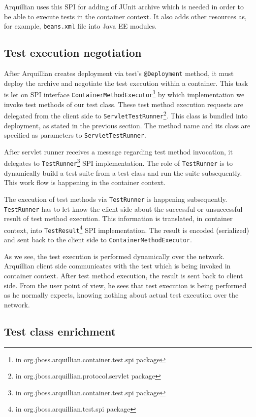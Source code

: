 \documentclass[12pt,final,oneside]{fithesis}
\begin{document}
Arquillian uses this SPI for adding of JUnit archive which is needed in order to be able to execute tests in the container context. It also adds other resources as, for example, \texttt{beans.xml} file into Java EE modules.

		\subsection{Test execution negotiation}

After Arquillian creates deployment via test's \texttt{@Deployment} method, it must deploy the archive and negotiate the test execution within a container. This task is let on SPI interface \texttt{ContainerMethodExecutor}\footnote{in org.jboss.arquillian.container.test.spi package} by which implementation we invoke test methods of our test class. These test method execution requests are delegated from the client side to \texttt{ServletTestRunner}\footnote{in org.jboss.arquillian.protocol.servlet package}. This class is bundled into deployment, as stated in the previous section. The method name and its class are specified as parameters to \texttt{ServletTestRunner}.

After servlet runner receives a message regarding test method invocation, it delegates to \texttt{TestRunner}\footnote {in org.jboss.arquillian.container.test.spi package} SPI implementation. The role of \texttt{TestRunner} is to dynamically build a test suite from a test class and run the suite subsequently. This work flow is happening in the container context.

The execution of test methods via \texttt{TestRunner} is happening subsequently. \texttt{TestRunner} has to let know the client side about the successful or unsuccessful result of test method execution. This information is translated, in container context, into \texttt{TestResult}\footnote{in org.jboss.arquillian.test.spi package} SPI implementation. The result is encoded (serialized) and sent back to the client side to \texttt{ContainerMethodExecutor}.

As we see, the test execution is performed dynamically over the network. Arquillian client side communicates with the test which is being invoked in container context. After test method execution, the result is sent back to client side. From the user point of view, he sees that test execution is being performed as he normally expects, knowing nothing about actual test execution over the network. 

		\subsection{Test class enrichment}	
\end{document}
